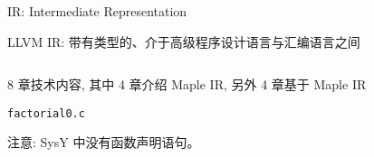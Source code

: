 
\begin{frame}{}
	\begin{center}

		\vspace{0.50cm}
		IR: Intermediate Representation

		\vspace{0.50cm}
		LLVM IR: 带有类型的、介于高级程序设计语言与汇编语言之间
	\end{center}
\end{frame}

\begin{frame}{}
	\begin{columns}
	\end{columns}

	\vspace{0.50cm}
	\begin{center}
		8 章技术内容, 其中 4 章介绍 Maple IR, 另外 4 章基于 Maple IR
	\end{center}
\end{frame}

\begin{frame}{}
\end{frame}

\begin{frame}{}
	\begin{center}
		\vspace{0.30cm}
		\texttt{factorial0.c}

		\vspace{0.80cm}
		注意: SysY 中没有函数声明语句。
	\end{center}
\end{frame}

\begin{frame}{}
	\begin{center}

		\vspace{0.30cm}
		  
	\end{center}
\end{frame}

